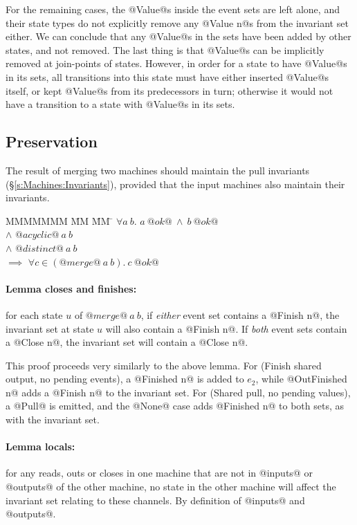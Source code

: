 For the remaining cases, the @Value@s inside the event sets are left alone, and their state types do not explicitly remove any @Value n@s from the invariant set either.
We can conclude that any @Value@s in the sets have been added by other states, and not removed.
The last thing is that @Value@s can be implicitly removed at join-points of states.
However, in order for a state to have @Value@s in its sets, all transitions into this state must have either inserted @Value@s itself, or kept @Value@s from its predecessors in turn; otherwise it would not have a transition to a state with @Value@s in its sets.


\subsection{Preservation}
The result of merging two machines should maintain the pull invariants (\S\ref{s:Machines:Invariants}), provided that the input machines also maintain their invariants.

\begin{tabbing}
MMMMMMM \= MM \= MM \= \kill
$\forall a~b.$
\>
\> $a~@ok@~\wedge~b~@ok@$
\\
\> $\wedge$
\> $@acyclic@~a~b$
\\
\> $\wedge$
\> $@distinct@~a~b$
\\
\> $\implies$
\> $\forall c \in (@merge@~a~b).\ c~@ok@$
\end{tabbing}

\paragraph{Lemma closes and finishes:} 
for each state $u$ of $@merge@~a~b$, if \emph{either} event set contains a @Finish n@, the invariant set at state $u$ will also contain a @Finish n@.
If \emph{both} event sets contain a @Close n@, the invariant set will contain a @Close n@.

This proof proceeds very similarly to the above lemma.
For (Finish shared output, no pending events), a @Finished n@ is added to $e_2$, while @OutFinished n@ adds a @Finish n@ to the invariant set.
For (Shared pull, no pending values), a @Pull@ is emitted, and the @None@ case adds @Finished n@ to both sets, as with the invariant set.


\paragraph{Lemma locals:} for any reads, outs or closes in one machine that are not in @inputs@ or @outputs@ of the other machine, no state in the other machine will affect the invariant set relating to these channels.
By definition of @inputs@ and @outputs@.

